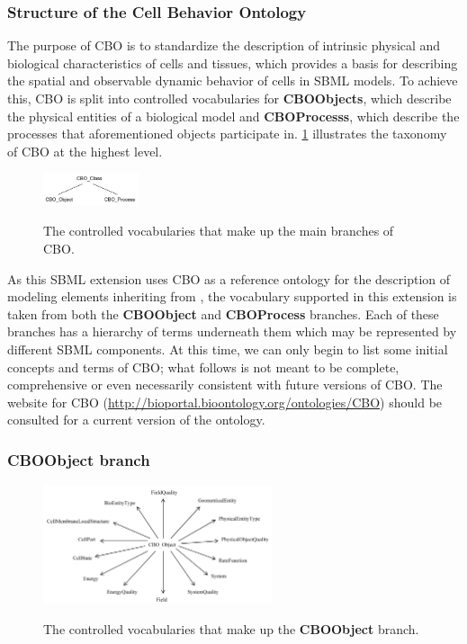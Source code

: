 \subsubsection{Structure of the Cell Behavior Ontology}
\label{subsec:CBOstructure}

The purpose of CBO is to standardize the description of intrinsic physical and biological characteristics of cells and tissues, which provides a basis for describing the spatial and observable dynamic behavior of cells in SBML models. To achieve this, CBO is split into controlled vocabularies for \textbf{CBO\textunderscore Objects}, which describe the physical entities of a biological model and \textbf{CBO\textunderscore Processs}, which describe the processes that aforementioned objects participate in. \ref{fig:CBOHierarchy} illustrates the taxonomy of CBO at the highest level.

\begin{figure}[tbhp]
	\centering
	\includegraphics[width=0.25\textwidth]{images/CBO_Hierarchy.pdf}\\
	\caption{The controlled vocabularies that make up the main branches of CBO.} \label{fig:CBOHierarchy}
\end{figure}

As this SBML extension uses CBO as a reference ontology for the description of modeling elements inheriting from \SBase, the vocabulary supported in this extension is taken from both the \textbf{CBO\textunderscore Object} and \textbf{CBO\textunderscore Process} branches. Each of these  branches has a hierarchy of terms underneath them which may be represented by different SBML components. At this time, we can only begin to list some initial concepts and terms of CBO; what follows is not meant to be complete, comprehensive or even necessarily consistent with future versions of CBO. The website for CBO (\url{http://bioportal.bioontology.org/ontologies/CBO}) should be consulted for a current version of the ontology.

\subsubsection{CBO\textunderscore Object branch}
\label{subsubsec:CBOObjectBranch}

\begin{figure}[tbhp]
	\centering
	\includegraphics[width=0.60\textwidth]{images/CBO_ObjectBranch}\\
	\caption{The controlled vocabularies that make up the \textbf{CBO\textunderscore Object} branch.} \label{fig:CBOObjectBranch}
\end{figure}

